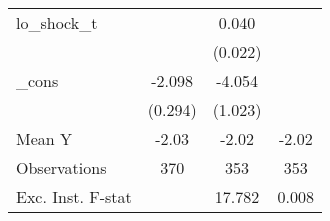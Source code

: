 {\begin{tabular}{l*{3}{c}}
\addlinespace
lo\_shock\_t  &                     &       0.040\sym{*}  &                     \\
            &                     &     (0.022)         &                     \\
\addlinespace
\_cons      &      -2.098\sym{***}&      -4.054\sym{***}&                     \\
            &     (0.294)         &     (1.023)         &                     \\
\midrule
Mean Y      &       -2.03         &       -2.02         &       -2.02         \\
Observations&         370         &         353         &         353         \\
Exc. Inst. F-stat&                     &      17.782         &       0.008         \\
\bottomrule
\end{tabular}
}
